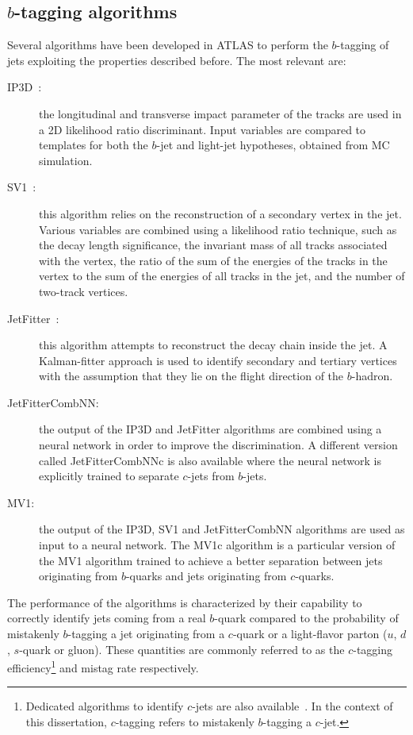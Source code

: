 \subsection{$b$-tagging algorithms}
Several algorithms have been developed in ATLAS to perform the $b$-tagging of jets exploiting the properties described before. The most relevant are:
\begin{description}
  \item[IP3D~\cite{HighPerf}:] the longitudinal and transverse impact parameter of the tracks are used in a 2D likelihood ratio discriminant. Input variables are compared to templates for both the $b$-jet and light-jet hypotheses, obtained from MC simulation. 

  \item[SV1~\cite{HighPerf}:] this algorithm relies on the reconstruction of a secondary vertex in the jet. %
    Various variables are combined using a likelihood ratio technique, such as the decay length significance, the invariant mass of all tracks associated with the vertex, the ratio of the sum of the energies of the tracks in the vertex to the sum of the energies of all tracks in the jet, and the number of two-track vertices.

  \item[JetFitter~\cite{JetFitter}:] this algorithm attempts to reconstruct the decay chain inside the jet. A Kalman-fitter approach is used to identify secondary and tertiary vertices with the assumption that they lie on the flight direction of the $b$-hadron.

\item[JetFitterCombNN:] the output of the IP3D and JetFitter algorithms are combined using a neural network in order to improve the discrimination. A different version called JetFitterCombNNc is also available where the neural network is explicitly trained to separate $c$-jets from $b$-jets.

\item[MV1:] the output of the IP3D, SV1 and JetFitterCombNN algorithms are used as input to a neural network. The MV1c algorithm is a particular version of the MV1 algorithm trained to achieve a better separation between jets originating from $b$-quarks and jets originating from $c$-quarks.
\end{description} 

The performance of the algorithms is characterized by their capability to correctly identify jets coming from a real $b$-quark compared to the probability of 
mistakenly $b$-tagging a jet originating from a $c$-quark or a light-flavor parton ($u$, $d$, $s$-quark or gluon). These quantities are commonly referred to as the $c$-tagging efficiency\footnote{
  Dedicated algorithms to identify $c$-jets are also available~\cite{charmtag}. In the context of this dissertation, $c$-tagging refers to mistakenly $b$-tagging a $c$-jet. } 
  and mistag rate respectively.

